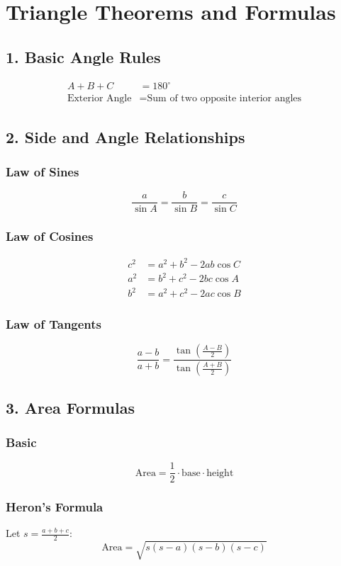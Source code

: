\chapter{Triangle Theorems and Formulas}

\section*{1. Basic Angle Rules}
\begin{align*}
A + B + C &= 180^\circ \\
\text{Exterior Angle} &= \text{Sum of two opposite interior angles}
\end{align*}

\section*{2. Side and Angle Relationships}
\subsection*{Law of Sines}
\[
\frac{a}{\sin A} = \frac{b}{\sin B} = \frac{c}{\sin C}
\]

\subsection*{Law of Cosines}
\begin{align*}
c^2 &= a^2 + b^2 - 2ab\cos C \\
a^2 &= b^2 + c^2 - 2bc\cos A \\
b^2 &= a^2 + c^2 - 2ac\cos B
\end{align*}

\subsection*{Law of Tangents}
\[
\frac{a - b}{a + b} = \frac{\tan\left(\frac{A - B}{2}\right)}{\tan\left(\frac{A + B}{2}\right)}
\]

\section*{3. Area Formulas}
\subsection*{Basic}
\[
\text{Area} = \frac{1}{2} \cdot \text{base} \cdot \text{height}
\]

\subsection*{Heron’s Formula}
Let \( s = \frac{a + b + c}{2} \):
\[
\text{Area} = \sqrt{s(s - a)(s - b)(s - c)}
\]

